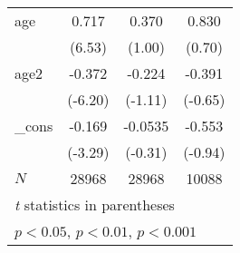 \begin{table}
\begin{center}
\begin{tabular}{l*{3}{c}}
age         &       0.717\sym{***}&       0.370         &       0.830         \\
            &      (6.53)         &      (1.00)         &      (0.70)         \\
[1em]
age2        &      -0.372\sym{***}&      -0.224         &      -0.391         \\
            &     (-6.20)         &     (-1.11)         &     (-0.65)         \\
[1em]
\_cons      &      -0.169\sym{***}&     -0.0535         &      -0.553         \\
            &     (-3.29)         &     (-0.31)         &     (-0.94)         \\
\hline
\(N\)       &       28968         &       28968         &       10088         \\
\hline\hline
\multicolumn{4}{l}{\footnotesize \textit{t} statistics in parentheses}\\
\multicolumn{4}{l}{\footnotesize \sym{*} \(p<0.05\), \sym{**} \(p<0.01\), \sym{***} \(p<0.001\)}\\
\end{tabular}
\end{center}
\end{table}
